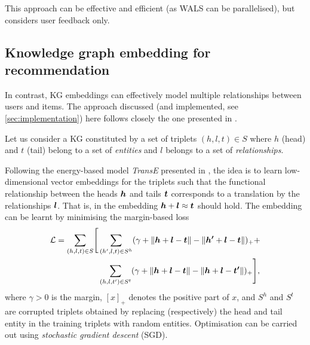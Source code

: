 This approach can be effective and efficient (as WALS can be parallelised), but considers user feedback only.

\subsection{Knowledge graph embedding for recommendation}\label{sec:kgrecom}

In contrast, KG embeddings  can effectively model multiple relationships between users and items.
The approach discussed (and implemented, see \cref{sec:implementation}) here follows closely the one presented in \cite{zhang2018learning}.

Let us consider a KG constituted by a set of triplets $(h, l, t) \in S$ where $h$ (head) and $t$ (tail) belong to a set of \emph{entities} and $l$ belongs to a set of \emph{relationships}.

Following the energy-based model \emph{TransE}\footnotemark{} presented in \cite{bordes2013translating}, the idea is to learn low-dimensional vector embeddings for the triplets such that the functional relationship between the heads $\boldsymbol{h}$ and tails $\boldsymbol{t}$ corresponds to a translation by the relationships $\boldsymbol{l}$.
That is, in the embedding $\boldsymbol{h} + \boldsymbol{l} \approx \boldsymbol{t}$ should hold.
The embedding can be learnt by minimising the margin-based loss
\begin{align}\label{eq:transe}
  \mathcal{L} = \sum_{(h, l, t) \in S} \Biggl[ &\sum_{(h', l, t) \in S^h} (\gamma + \left\lVert\boldsymbol{h} + \boldsymbol{l} - \boldsymbol{t}\right\rVert - \left\lVert\boldsymbol{h'} + \boldsymbol{l} - \boldsymbol{t}\right\rVert)_{+} +\\
                                              & \sum_{(h, l, t') \in S^t} (\gamma + \left\lVert\boldsymbol{h} + \boldsymbol{l} - \boldsymbol{t}\right\rVert - \left\lVert\boldsymbol{h} + \boldsymbol{l} - \boldsymbol{t'}\right\rVert)_{+} \Biggr]\nonumber,
\end{align}
where $\gamma>0$ is the margin, $[x]_+$ denotes the positive part of $x$, and $S^h$ and $S^t$ are corrupted triplets obtained by replacing (respectively) the head and tail entity in the training triplets with random entities.
Optimisation can be carried out using \emph{stochastic gradient descent} (SGD).


